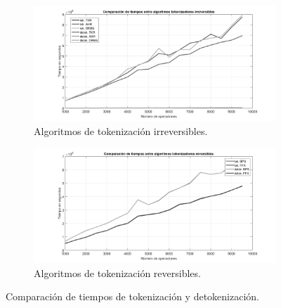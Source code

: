 \begin{figure}
  \centering
  \begin{subfigure}{1\textwidth}
    \begin{center}
      \includegraphics[width=1\linewidth]{diagramas/todo_irrev_bn}
      \caption{Algoritmos de tokenización irreversibles.}
    \end{center}
  \end{subfigure}
  \begin{subfigure}{0.9\textwidth}
    \begin{center}
      \includegraphics[width=1\linewidth]{diagramas/todo_rev_bn}
      \caption{Algoritmos de tokenización reversibles.}
    \end{center}
  \end{subfigure}
  \caption{Comparación de tiempos de tokenización y detokenización.}
  \label{figura:tok_comp}
\end{figure}
